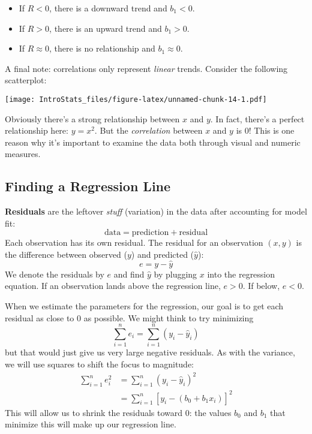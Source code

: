 \documentclass[
]{book}
\providecommand{\tightlist}{%
  \setlength{\itemsep}{0pt}\setlength{\parskip}{0pt}}
\begin{document}
\begin{itemize}
\tightlist
\item
  If \(R < 0\), there is a downward trend and \(b_1 < 0\).
\item
  If \(R > 0\), there is an upward trend and \(b_1 > 0\).
\item
  If \(R \approx 0\), there is no relationship and \(b_1 \approx 0\).
\end{itemize}

A final note: correlations only represent \emph{linear} trends. Consider the following scatterplot:

\texttt{[image: IntroStats\_files/figure-latex/unnamed-chunk-14-1.pdf]}

Obviously there's a strong relationship between \(x\) and \(y\). In fact, there's a perfect relationship here: \(y = x^2\). But the \emph{correlation} between \(x\) and \(y\) is 0! This is one reason why it's important to examine the data both through visual and numeric measures.

\hypertarget{finding-a-regression-line}{%
\subsection{Finding a Regression Line}\label{finding-a-regression-line}}

\textbf{Residuals} are the leftover \emph{stuff} (variation) in the data after accounting for model fit: \[\text{data} = \text{prediction} + \text{residual}\] Each observation has its own residual. The residual for an observation \((x,y)\) is the difference between observed (\(y\)) and predicted (\(\hat{y}\)): \[e = y - \hat{y}\] We denote the residuals by \(e\) and find \(\hat{y}\) by plugging \(x\) into the regression equation. If an observation lands above the regression line, \(e > 0\). If below, \(e < 0\).

When we estimate the parameters for the regression, our goal is to get each residual as close to 0 as possible. We might think to try minimizing \[\sum_{i=1}^n e_i = \sum_{i=1}^n (y_i - \hat{y}_i)\] but that would just give us very large negative residuals. As with the variance, we will use squares to shift the focus to magnitude:
\begin{align}
\sum_{i=1}^n e_i^2 &= \sum_{i=1}^n (y_i - \hat{y}_i)^2 \\
& = \sum_{i=1}^n [y_i - (b_0 + b_1 x_i)]^2
\end{align}
This will allow us to shrink the residuals toward 0: the values \(b_0\) and \(b_1\) that minimize this will make up our regression line.
\end{document}
